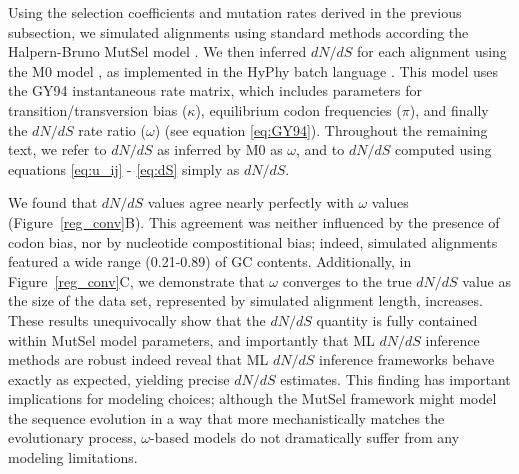 \documentclass{pnastwo}
\begin{document}
\begin{article}
Using the selection coefficients and mutation rates derived in the previous subsection, we simulated alignments using standard methods \cite{Yang2006} according the Halpern-Bruno MutSel model \cite{HalpernBruno1998}. We then inferred $dN/dS$ for each alignment using the M0 model \cite{GoldmanYang1994,Yangetal2000}, as implemented in the HyPhy batch language \cite{KosakovskyPondetal2005}. This model uses the GY94 instantaneous rate matrix, which includes parameters for transition/transversion bias ($\kappa$), equilibrium codon frequencies ($\pi$), and finally the $dN/dS$ rate ratio ($\omega$) (see equation \eqref{eq:GY94}). Throughout the remaining text, we refer to $dN/dS$ as inferred by M0 as $\omega$, and to $dN/dS$ computed using equations \eqref{eq:u_ij} - \eqref{eq:dS} simply as $dN/dS$. 

We found that $dN/dS$ values agree nearly perfectly with $\omega$ values (Figure~\ref{reg_conv}B). This agreement was neither influenced by the presence of codon bias, nor by nucleotide compostitional bias; indeed, simulated alignments featured a wide range (0.21-0.89) of GC contents. Additionally, in Figure~\ref{reg_conv}C, we demonstrate that $\omega$ converges to the true $dN/dS$ value as the size of the data set, represented by simulated alignment length, increases. These results unequivocally show that the $dN/dS$ quantity is fully contained within MutSel model parameters, and importantly that ML $dN/dS$ inference methods are robust indeed reveal that ML $dN/dS$ inference frameworks behave exactly as expected, yielding precise $dN/dS$ estimates. This finding has important implications for modeling choices; although the MutSel framework might model the sequence evolution in a way that more mechanistically matches the evolutionary process, $\omega$-based models do not dramatically suffer from any modeling limitations. 


\end{article}
\end{document}
